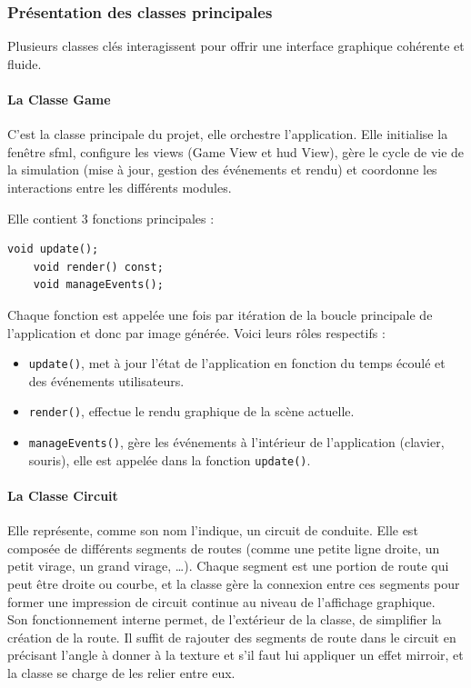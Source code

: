 \subsubsection{Présentation des classes principales}\label{subsubsec:presentation-des-classes-principales}
Plusieurs classes clés interagissent pour offrir une interface graphique cohérente et fluide.

\paragraph[Game]{La Classe \textbf{Game}}\label{par:class_game}
C'est la classe principale du projet, elle orchestre l'application.
Elle initialise la fenêtre \gls{sfml}, configure les \glspl{view} (Game View et \gls{hud} View), gère le cycle de vie de la simulation (mise à jour, gestion des événements et rendu) et coordonne les interactions entre les différents modules.

Elle contient 3 fonctions principales :
\begin{lstlisting}[style=CStyle, label={lst:game_class}]
    void update();
    void render() const;
    void manageEvents();
\end{lstlisting}
Chaque fonction est appelée une fois par itération de la boucle principale de l'application et donc par image générée.
Voici leurs rôles respectifs :
\begin{itemize}
    \item \texttt{update()}, met à jour l'état de l'application en fonction du temps écoulé et des événements utilisateurs.
    \item \texttt{render()}, effectue le rendu graphique de la scène actuelle.
    \item \texttt{manageEvents()}, gère les événements à l'intérieur de l'application (clavier, souris), elle est appelée dans la fonction \texttt{update()}.
\end{itemize}

\paragraph[Circuit]{La Classe \textbf{Circuit}}
Elle représente, comme son nom l'indique, un circuit de conduite.
Elle est composée de différents segments de routes (comme une petite ligne droite, un petit virage, un grand virage, \dots).
Chaque segment est une portion de route qui peut être droite ou courbe, et la classe gère la connexion entre ces segments pour former une impression de circuit continue au niveau de l'affichage graphique. \\
Son fonctionnement interne permet, de l'extérieur de la classe, de simplifier la création de la route.
Il suffit de rajouter des segments de route dans le circuit en précisant l'angle à donner à la texture et s'il faut lui appliquer un effet mirroir, et la classe se charge de les relier entre eux.

